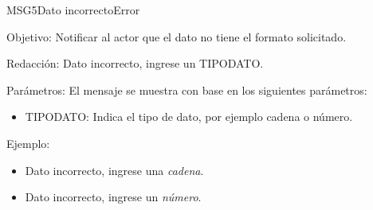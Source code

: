 \begin{mensaje}{MSG5}{Dato incorrecto}{Error}
	\item [Objetivo:] Notificar al actor que el dato no tiene el formato solicitado.
	\item[Redacción:] Dato incorrecto, ingrese un TIPODATO.
	\item[Parámetros:] El mensaje se muestra con base en los siguientes parámetros:
		\begin{itemize}
 			\item TIPODATO: Indica el tipo de dato, por ejemplo cadena o número.
		\end{itemize}
	\item[Ejemplo:] \begin{itemize}
		\item Dato incorrecto, ingrese una {\em cadena}.
		\item Dato incorrecto, ingrese un {\em número}.
	\end{itemize}
\end{mensaje}